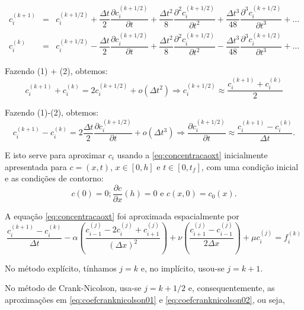 \begin{eqnarray}
c_{i}^{(k+1)}
&=&
c_{i}^{(k+1/2)}
+
\dfrac{\Delta t}{2} \dfrac{\partial c_{i}^{(k+1/2)}}{\partial t}
+
\dfrac{\Delta t^2}{8} \dfrac{\partial^2 c_{i}^{(k+1/2)}}{\partial t^2}
+
\dfrac{\Delta t^3}{48} \dfrac{\partial^3 c_{i}^{(k+1/2)}}{\partial t^3}
+ \ldots \\
c_{i}^{(k)}
&=&
c_{i}^{(k+1/2)}
-
\dfrac{\Delta t}{2} \dfrac{\partial c_{i}^{(k+1/2)}}{\partial t}
+
\dfrac{\Delta t^2}{8} \dfrac{\partial^2 c_{i}^{(k+1/2)}}{\partial t^2}
-
\dfrac{\Delta t^3}{48} \dfrac{\partial^3 c_{i}^{(k+1/2)}}{\partial t^3}
+ \ldots
\end{eqnarray}

Fazendo (1) + (2), obtemos:
\begin{equation}
c_{i}^{(k+1)} + c_{i}^{(k)} = 2 c_{i}^{(k+1/2)} + o(\Delta t^2)
\Rightarrow
c_{i}^{(k+1/2)} \approx \dfrac{c_{i}^{(k+1)}+c_{i}^{(k)}}{2}
\label{eq:coefcranknicolson01}
\end{equation}


Fazendo (1)-(2), obtemos:
\begin{equation}
c_{i}^{(k+1)} - c_{i}^{(k)} = 2 \dfrac{\Delta t}{2} \dfrac{\partial c_{i}^{(k+1/2)}}{\partial t} + o(\Delta t^3)
\Rightarrow
\dfrac{\partial c_{i}^{(k+1/2)}}{\partial t} \approx \dfrac{c_{i}^{(k+1)}-c_{i}^{(k)}}{\Delta t}.
\label{eq:coefcranknicolson02}
\end{equation}

Ε isto serve para aproximar $c_i$ usando a \autoref{eq:concentracaoxt} inicialmente apresentada para $c = (x, t)$, $x\in [0,h]$ e $t \in [0, t_f]$, com uma condição inicial e as condições de contorno:
$$c(0) = 0; \dfrac{\partial c}{\partial x}(h) = 0 \mbox{ e } c(x,0)=c_0(x).$$

A equação \autoref{eq:concentracaoxt} foi aproximada espacialmente por
$$\dfrac{c_{i}^{(k+1)} - c_{i}^{(k)}}{\Delta t}
-
\alpha \left(\dfrac{c_{i-1}^{(j)} - 2 c_{i}^{(j)} + c_{i+1}^{(j)}}{(\Delta x)^{2}}\right)
+
\nu \left(\dfrac{c_{i+1}^{(j)} - c_{i-1}^{(j)}}{2 \Delta x}\right)
+
\mu c_{i}^{(j)} = f_{i}^{(k)}
$$

No método explícito, tínhamos $j=k$ e, no implícito, usou-se $j=k+1$.

No método de Crank-Nicolson, usa-se $j = k+1/2$ e, consequentemente, as aproximações em \eqref{eq:coefcranknicolson01} e \eqref{eq:coefcranknicolson02}, ou seja,


